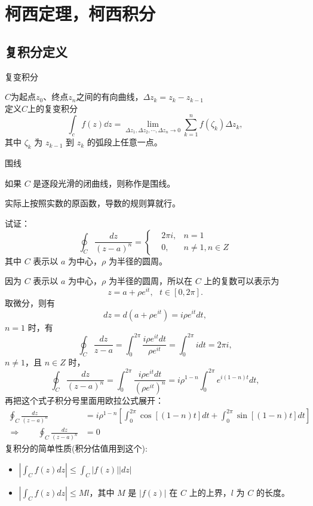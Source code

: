 \documentclass[cn,hazy,blue,14pt,normal]{elegantnote}
\numberwithin{equation}{section}
\begin{document}
\newpage
\section{柯西定理，柯西积分}
\newpage
\subsection{复积分定义}
\begin{definition}
	复变积分
\end{definition}

$C$为起点$z_0$、终点$z_n$之间的有向曲线，$\Delta z_k = z_k - z_{k-1}$\\
定义$C$上的复变积分
$$
\int_c f(z) \dd z = \lim_{\Delta z_1, \Delta z_2, \cdots, \Delta z_n \rightarrow 0} \sum^n_{k=1} f(\zeta_k) \Delta z_k,
$$
其中 $\zeta_k$ 为 $z_{k-1}$ 到 $z_k$ 的弧段上任意一点。

\begin{definition}
	围线
\end{definition}

如果 $C$ 是逐段光滑的闭曲线，则称作是围线。
\begin{note}
	实际上按照实数的原函数，导数的规则算就行。
\end{note}
\begin{example}\label{example3.1}
试证：
$$
\oint_C \frac{ dz }{ (z-a)^n } = \left\{
\begin{aligned}
& 2\pi i, & n=1 \\
& 0, & n\neq 1, n\in Z
\end{aligned}
\right.
$$
其中 $C$ 表示以 $a$ 为中心，$\rho$ 为半径的圆周。
\end{example}

因为 $C$ 表示以 $a$ 为中心，$\rho$ 为半径的圆周，所以在 $C$ 上的复数可以表示为
$$
z = a+\rho e^{it}, ~~~ t \in [0,2\pi].
$$
取微分，则有
$$
dz = d(a+\rho e^{it}) = i\rho e^{it} dt,
$$
$n=1$ 时，有
$$
\oint_C \frac{dz}{z-a} = \int^{2\pi}_0 \frac{ i\rho e^{it} dt}{\rho e^{it}} = \int^{2\pi}_0 idt = 2\pi i,
$$
$n\neq 1$，且 $n\in Z$ 时，
$$
\oint_C \frac{dz}{(z-a)^n} = \int^{2\pi}_0 \frac{ i\rho e^{it} dt}{(\rho e^{it})^n} = i \rho^{1-n} \int^{2\pi}_0 e^{i(1-n)t}dt,
$$
再把这个式子积分号里面用欧拉公式展开：
$$
\begin{aligned}
	\oint_C \frac{dz}{(z-a)^n} &= i \rho^{1-n} \left[ \int^{2\pi}_0 \cos[(1-n)t] dt + \int^{2\pi}_0 \sin[(1-n)t] dt\right]\\
	\Rightarrow \qquad \oint_C \frac{dz}{(z-a)^n} &= 0
\end{aligned}
$$
复积分的简单性质(积分估值用到这个):
\begin{itemize}
	\item $|\int_C f(z) dz | \leq \int_C |f(z)| |dz|$
	\item $|\int_C f(z) dz | \leq Ml$，其中 $M$ 是 $|f(z)|$ 在 $C$ 上的上界，$l$ 为 $C$ 的长度。
\end{itemize}
\end{document}
